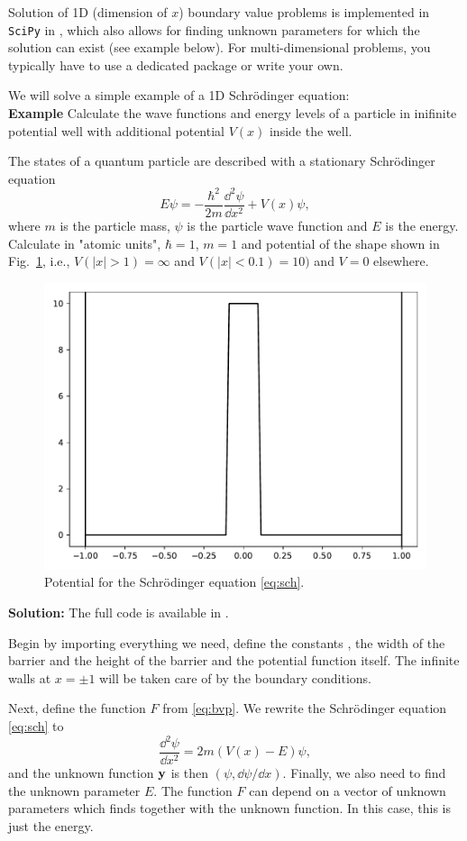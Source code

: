 Solution of 1D (dimension of $x$) boundary value problems is implemented in \verb|SciPy| in , which also allows for finding unknown parameters for which the solution can exist (see example below). For multi-dimensional problems, you typically have to use a dedicated package or write your own.

We will solve a simple example of a 1D Schr\"{o}dinger equation:\\
\textbf{Example} Calculate the wave functions and energy levels of a particle in inifinite potential well with additional potential $V(x)$ inside the well.

The states of a quantum particle are described with a stationary Schr\"{o}dinger equation
\begin{equation}
    \label{eq:sch}
    E\psi = -\frac{\hbar^2}{2m}\frac{\dd^2\psi}{\dd x^2} + V(x)\psi,
\end{equation}
where $m$ is the particle mass, $\psi$ is the particle wave function and $E$ is the energy. Calculate in "atomic units", $\hbar = 1$, $m=1$ and potential of the shape shown in Fig.~\ref{fig:potential}, i.e., $V(|x| > 1) = \infty$ and $V(|x| < 0.1) = 10)$ and $V=0$ elsewhere.
\begin{figure}[h!]
    \centering
    \label{fig:potential}
    \includegraphics[width=0.5\linewidth]{sch_potential.pdf}
    \caption{Potential for the Schrödinger equation \eqref{eq:sch}.}
\end{figure}

\textbf{Solution:} The full code is available in . 

Begin by importing everything we need, define the constants , the width of the barrier and  the height of the barrier and the potential function itself. The infinite walls at $x=\pm 1$ will be taken care of by the boundary conditions.


Next, define the function $F$ from \eqref{eq:bvp}. We rewrite the Schrödinger equation \eqref{eq:sch} to
\begin{equation}
    \frac{\dd^2\psi}{\dd x^2} = 2m(V(x) - E)\psi,
\end{equation}
and the unknown function $\mathbf{y}$ is then $(\psi, \dd \psi/\dd x)$. Finally, we also need to find the unknown parameter $E$. The function $F$ can depend on a vector of unknown parameters which  finds together with the unknown function. In this case, this is just the energy.


